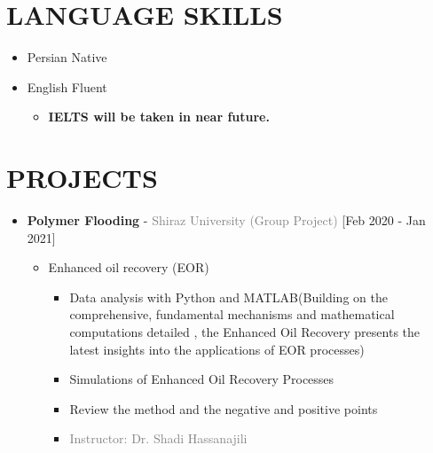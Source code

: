 \documentclass[10pt,a4paper,sans]{moderncv} %
\begin{document}
	
	
	
	
	
	
	\vspace{-1.0em}
	
	\section{LANGUAGE SKILLS}
	
	\begin{itemize}
	\item Persian \hspace{5 pt} Native
	\item English \hspace{6 pt} Fluent   
		\begin{itemize}
			 \item\textbf{IELTS will be taken in near future.}

		\end{itemize}
	\end{itemize} 
	
	
	\vspace{5.5em}
	
	\vspace{  -0.4 em}
	\section{PROJECTS}
	\begin{itemize}
		\item {}  \textbf{Polymer Flooding} - \textcolor{gray}{Shiraz University}    \hfill\textcolor{gray}{(Group Project)}   [Feb 2020 - Jan 2021]
		\begin{itemize}
			\item Enhanced oil recovery (EOR) 
			\begin{itemize} 
		     	\item Data analysis with Python and MATLAB(Building on the comprehensive, fundamental mechanisms and mathematical computations detailed , the Enhanced Oil Recovery presents the latest insights into the applications of EOR processes)
		     	\item Simulations of Enhanced Oil Recovery Processes
				\item Review the method and the negative and positive points
				
			    
				\item\textcolor{gray}{Instructor: Dr. Shadi Hassanajili}
			\end{itemize}
			

			
		\end{itemize}
	\end{itemize}
	
\end{document}
